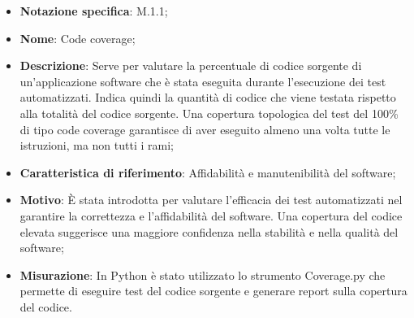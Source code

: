 \begin{itemize}
    \item \textbf{Notazione specifica}: M.1.1;
    \item \textbf{Nome}: Code coverage;
    \item \textbf{Descrizione}: Serve per valutare la percentuale di codice sorgente di un'applicazione software che è stata eseguita durante l'esecuzione dei test automatizzati. Indica quindi la quantità di codice che viene testata rispetto alla totalità del codice sorgente. Una copertura topologica del test del 100\% di tipo code coverage garantisce di aver eseguito almeno una volta tutte le istruzioni, ma non tutti i rami;
    \item \textbf{Caratteristica di riferimento}: Affidabilità e manutenibilità del software;
    \item \textbf{Motivo}: È stata introdotta per valutare l'efficacia dei test automatizzati nel garantire la correttezza e l'affidabilità del software. Una copertura del codice elevata suggerisce una maggiore confidenza nella stabilità e nella qualità del software;
    \item \textbf{Misurazione}: In Python è stato utilizzato lo strumento Coverage.py che permette di eseguire test del codice sorgente e generare report sulla copertura del codice.

\end{itemize}
